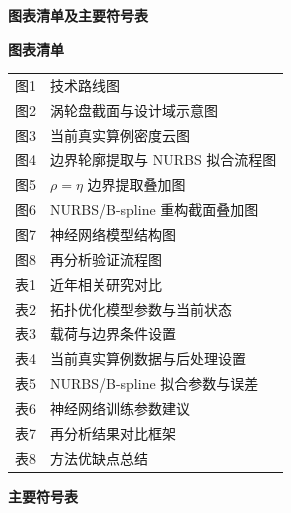 \documentclass{FRB-style}
\newcommand{\fronttitle}[1]{%
  \begin{center}{\heiti\zihao{3}\bfseries #1}\end{center}\vspace{0.5\baselineskip}%
}
\begin{document}
\clearpage
\tableofcontents

\clearpage
\fronttitle{图表清单及主要符号表}
{}

\noindent\textbf{图表清单}

\begin{longtable}{>{\raggedright\arraybackslash}p{}>{\raggedright\arraybackslash}p{}}
图1 & 技术路线图 \\
图2 & 涡轮盘截面与设计域示意图 \\
图3 & 当前真实算例密度云图 \\
图4 & 边界轮廓提取与 NURBS 拟合流程图 \\
图5 & $\rho=\eta$ 边界提取叠加图 \\
图6 & NURBS/B-spline 重构截面叠加图 \\
图7 & 神经网络模型结构图 \\
图8 & 再分析验证流程图 \\
表1 & 近年相关研究对比 \\
表2 & 拓扑优化模型参数与当前状态 \\
表3 & 载荷与边界条件设置 \\
表4 & 当前真实算例数据与后处理设置 \\
表5 & NURBS/B-spline 拟合参数与误差 \\
表6 & 神经网络训练参数建议 \\
表7 & 再分析结果对比框架 \\
表8 & 方法优缺点总结 \\
\end{longtable}

\vspace{0.5em}
\noindent\textbf{主要符号表}
\end{document}
